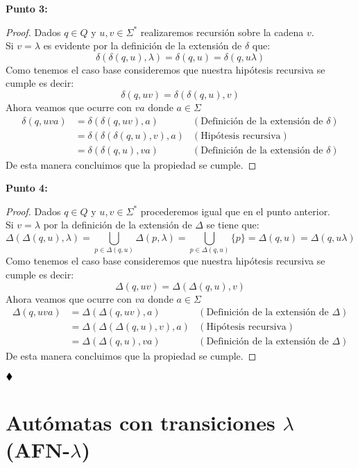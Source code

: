 \textbf{Punto 3:}
\begin{proof}
Dados $q\in Q$ y $u,v\in\Sigma^*$ realizaremos recursión sobre la cadena $v$.\\
Si $v=\lambda$ es evidente por la definición de la extensión de $\delta$ que:
$$\delta(\delta(q,u),\lambda)=\delta(q,u)=\delta(q,u\lambda)$$
Como tenemos el caso base consideremos que nuestra hipótesis recursiva se cumple es decir:
$$\delta(q,uv)=\delta(\delta(q,u),v)$$ 
Ahora veamos que ocurre con $va$ donde $a\in\Sigma$
\begin{align*}
      \delta(q,uva)&=\delta(\delta(q,uv),a)&(\text{Definición de la extensión de }\delta)\\
      &=\delta(\delta(\delta(q,u),v),a)&(\text{Hipótesis recursiva})\\
      &=\delta(\delta(q,u),va)&(\text{Definición de la extensión de }\delta)
  \end{align*} 
De esta manera concluimos que la propiedad se cumple. 

\end{proof}
\textbf{Punto 4:}
\begin{proof}
Dados $q\in Q$ y $u,v\in\Sigma^*$ procederemos igual que en el punto anterior.\\
Si $v=\lambda$ por la definición de la extensión de $\Delta$ se tiene que:
$$\Delta(\Delta(q,u),\lambda)=\bigcup_{p\in\Delta(q,u)}\Delta(p,\lambda)=\bigcup_{p\in\Delta(q,u)}\{p\}=\Delta(q,u)=\Delta(q,u\lambda)$$ 
Como tenemos el caso base consideremos que nuestra hipótesis recursiva se cumple es decir:
$$\Delta(q,uv)=\Delta(\Delta(q,u),v)$$ 
Ahora veamos que ocurre con $va$ donde $a\in\Sigma$ 
\begin{align*}
    \Delta(q,uva)&=\Delta(\Delta(q,uv),a)&(\text{Definición de la extensión de }\Delta)\\
      &=\Delta(\Delta(\Delta(q,u),v),a)&(\text{Hipótesis recursiva})\\
      &=\Delta(\Delta(q,u),va)&(\text{Definición de la extensión de }\Delta)  
  \end{align*} 
De esta manera concluimos que la propiedad se cumple. 
 
\end{proof}

$\hfill \blacklozenge$

\section{Autómatas con transiciones \texorpdfstring{\boldmath$\lambda$}{lambda} (AFN-\texorpdfstring{\boldmath$\lambda$}{lambda})} 

